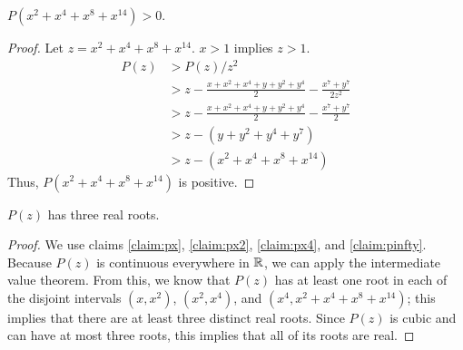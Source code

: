 \documentclass[10pt]{../usamts}
\begin{document}
\begin{solution}{4}
\begin{claim}
    $P(x^2 + x^4 + x^8 + x^{14}) > 0$.
    \label{claim:pinfty}
\end{claim}
\begin{proof}
    Let $z = x^2 + x^4 + x^8 + x^{14}$. $x > 1$ implies $z > 1$.
    \begin{align*}
    P(z) &> P(z)/z^2 \\
         &> z - \frac{x+x^2+x^4+y+y^2+y^4}{2} - \frac{x^7+y^7}{2z^2} \\
         &> z - \frac{x+x^2+x^4+y+y^2+y^4}{2} - \frac{x^7+y^7}{2} \\
         &> z - (y + y^2 + y^4 + y^7) \\
         &> z - (x^2 + x^4 + x^8 + x^{14})
    \end{align*}
    Thus,  $P(x^2 + x^4 + x^8 + x^{14})$ is positive.
\end{proof}

\begin{claim}
    $P(z)$ has three real roots.
\end{claim}

\begin{proof}
    We use claims \ref{claim:px}, \ref{claim:px2}, \ref{claim:px4}, and \ref{claim:pinfty}.
    Because $P(z)$ is continuous everywhere in $\mathbb{R}$, we can apply the intermediate value theorem.
    From this, we know that $P(z)$ has at least one root in each of the disjoint intervals $(x, x^2)$, $(x^2, x^4)$, and $(x^4, x^2 + x^4 + x^8 + x^{14})$; this implies that there are at least three distinct real roots. Since $P(z)$ is cubic and can have at most three roots, this implies that all of its roots are real.
\end{proof}

\end{solution}
\end{document}
